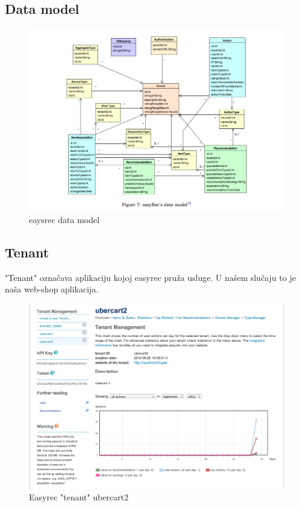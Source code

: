 \documentclass[times, utf8, seminar]{fit}
\begin{document}
{{\subsection{Data model}

\begin{figure}[H]
\centering
\includegraphics[width=14cm]{img/easyrec_data_model.png}
\caption{eaysrec data model\citep{bac_wien}}
\end{figure}

\subsection{Tenant}

"Tenant" označava aplikaciju kojoj easyrec pruža usluge. U našem slučaju to je naša web-shop aplikacija. 
\begin{figure}[H]
\centering
\includegraphics[width=12cm]{img/easyrec_1_tenant.png}
\caption{Easyrec "tenant" ubercart2}
\end{figure}

}}
\end{document}
